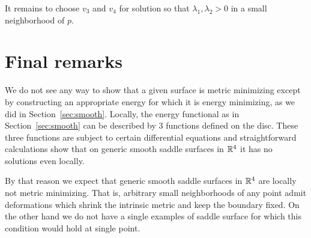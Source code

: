\documentclass{article}
\begin{document}
It remains to choose $v_3$ and $v_4$ for solution so that $\lambda_1, \lambda_2>0$ in a small neighborhood of $p$.
\qeds


\section{Final remarks}\label{Final remarks}

We do not see any way to show that a given surface is metric minimizing except by constructing an appropriate energy for which it is energy minimizing, as we did in Section~\ref{sec:smooth}.
Locally, the energy functional as in Section~\ref{sec:smooth} can be described by 3 functions defined on the disc.
These three functions are subject to certain differential equations and 
straightforward calculations show that on generic smooth saddle surfaces in $\mathbb{R}^4$ 
it has no solutions even locally.

By that reason we expect that generic smooth saddle surfaces in $\mathbb{R}^4$ are locally not metric minimizing. 
That is, arbitrary small neighborhoods of any point admit deformations which shrink 
the intrinsic metric and keep the boundary fixed.
On the other hand we do not have a single examples of saddle surface for which this condition would hold at single point.
\end{document}
